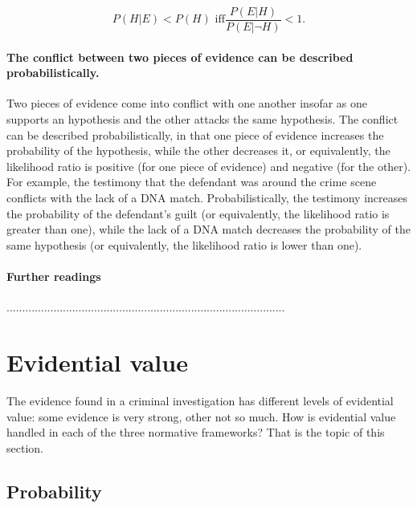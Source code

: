 \documentclass[10pt]{article}
\begin{document}
\[ P(H|E) < P(H) \text{ iff}  \frac{P(E|H)}{P(E|\neg H)} < 1.\]
%

\paragraph{The conflict between two pieces of evidence can be described probabilistically.}
Two pieces of evidence come into 
conflict with one another insofar as one supports an hypothesis 
and the other attacks the same hypothesis. 
The conflict can be described probabilistically, in that one piece of evidence increases 
the probability of the hypothesis, while the other decreases it, or equivalently, the likelihood ratio is positive (for one piece 
of evidence) and negative (for the other). 
For example, the testimony that the defendant was around the crime scene conflicts 
with the lack of a DNA match. Probabilistically, the testimony 
increases the probability of the defendant's guilt (or equivalently, the likelihood ratio is greater than one),
while the lack of a DNA match decreases the probability of the same hypothesis 
(or equivalently, the likelihood ratio is lower than one).

\paragraph{Further readings} 
.........................................................................................

\section{Evidential value}
\label{sec:str}

The evidence found in a criminal investigation has different levels of evidential value: some evidence is very strong, other not so much. How is evidential value handled in each of the three normative frameworks? That is the topic of this section.

\subsection{Probability}
\end{document}
